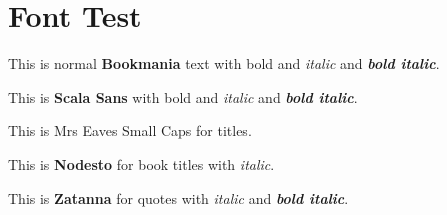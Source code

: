 \documentclass[fonts=wotc]{dndbook}
\begin{document}
\section{Font Test}

This is normal \textbf{Bookmania} text with bold and \textit{italic} and \textbf{\textit{bold italic}}.

{\sffamily This is \textbf{Scala Sans} with bold and \textit{italic} and \textbf{\textit{bold italic}}.}

{\sctitlefont This is Mrs Eaves Small Caps for titles.}

{\booktitlefont This is \textbf{Nodesto} for book titles with \textit{italic}.}

{\quotefont This is \textbf{Zatanna} for quotes with \textit{italic} and \textbf{\textit{bold italic}}.}
\end{document}
